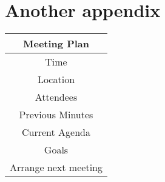 \documentclass{l3deliverable}
\begin{document}
\section{Another appendix}

\begin{center}{
\begin{tabular}{|c|}
\hline \textbf{Meeting Plan}\\ 
\hline
\hline Time\\
\hline Location\\
\hline Attendees\\
\hline Previous Minutes\\
\hline Current Agenda\\
\hline Goals\\
\hline Arrange next meeting\\
\hline
\end{tabular} }
\end{center}
\end{document}
